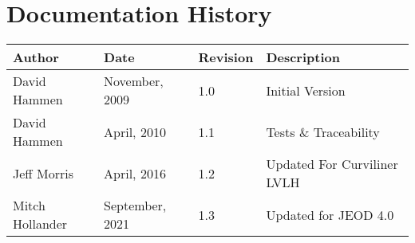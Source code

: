 
\section{Documentation History}
\begin{tabular}{||l|l|l|l|} \hline
{\bf Author } & {\bf Date} & {\bf Revision} & {\bf Description} \\ \hline \hline
 David Hammen & November, 2009 & 1.0 & Initial Version \\ \hline
 David Hammen & April, 2010 & 1.1 & Tests \& Traceability \\ \hline
 Jeff Morris & April, 2016 & 1.2 & Updated For Curviliner LVLH \\ \hline
 Mitch Hollander & September, 2021 & 1.3 & Updated for JEOD 4.0 \\ \hline
\end{tabular}
